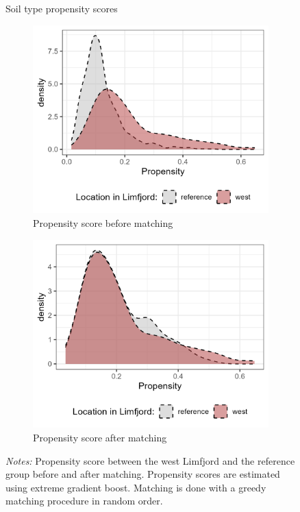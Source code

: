 \documentclass[11pt]{article}
\begin{document}
\begin{figure}[h!]
    \centering
    \caption{Soil type propensity scores}
    \begin{subfigure}[b]{0.45\textwidth}
        \centering
        \caption{\label{fig:prop1} Propensity score before matching}
        \includegraphics[width=\textwidth]{Plots/Propensity_before.png}
    \end{subfigure}
    \hfill
    \begin{subfigure}[b]{0.45\textwidth}
        \centering
        \caption{\label{fig:prop2} Propensity score after matching}
        \includegraphics[width=\textwidth]{Plots/Propensity_after.png}
    \end{subfigure}
    \parbox{0.9\textwidth}{
    \caption*{\footnotesize \textit{Notes:} Propensity score between the west Limfjord and the reference group before and after matching. Propensity scores are estimated using extreme gradient boost. Matching is done with a greedy matching procedure in random order.}
}
    \label{fig:prop_score}
\end{figure}
\end{document}
